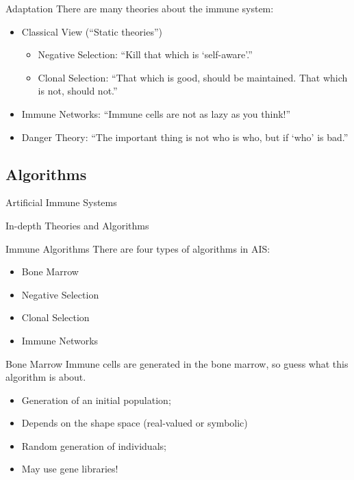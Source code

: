 \documentclass[xcolor=svgnames]{beamer}
\newcommand{\introframe}[2]{
    \begin{frame}
	   \vfill
	   \hfill\Huge{#1}
	   
	   \vspace{1em}
	   
	   \hfill\Large{#2}
	   \vfill
    \end{frame}
}
\begin{document}
		\begin{frame}{Adaptation}
		    There are many theories about the immune system:
		    
		    \begin{itemize}
		        \item Classical View (``Static theories'')
		        \begin{itemize}
    		        \item Negative Selection: ``Kill that which is `self-aware'.''
    		        \item Clonal Selection: ``That which is good, should be maintained. That which is not, should not.''
    		    \end{itemize}
    		    \pause
		        \item Immune Networks: ``Immune cells are not as lazy as you think!''
		        \pause
		        \item Danger Theory: ``The important thing is not who is who, but if `who' is bad.''
		    \end{itemize}
		\end{frame}
		
	\subsection{Algorithms}
	
        \introframe{Artificial Immune Systems}{In-depth Theories and Algorithms}

        \begin{frame}{Immune Algorithms}
            There are four types of algorithms in AIS:

            \begin{itemize}
                \item Bone Marrow
                \item Negative Selection
                \item Clonal Selection
                \item Immune Networks
            \end{itemize}
        \end{frame}
        
        \begin{frame}{Bone Marrow}
            Immune cells are generated in the bone marrow, so guess what this algorithm is about.
            \begin{itemize}
                \item Generation of an initial population;
                \item Depends on the shape space (real-valued or symbolic)
                \item Random generation of individuals;
                \item May use gene libraries!
            \end{itemize}
        \end{frame}
        
\end{document}

